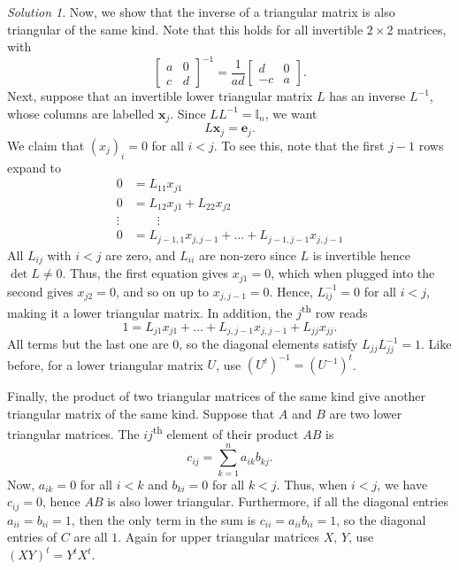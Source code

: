 \documentclass[11pt]{report}
\renewcommand\vec\boldsymbol
\def\vx{\vec{x}}
\def\ve{\vec{e}}
\theoremstyle{remark}
\newtheorem*{solution}{Solution}
\begin{document}
\begin{solution}
        Now, we show that the inverse of a triangular matrix is also triangular of
        the same kind. Note that this holds for all invertible $2\times 2$ matrices,
        with \[
            \begin{bmatrix}
                a & 0 \\ c & d
            \end{bmatrix}^{-1} = \frac{1}{ad}\begin{bmatrix}
                d & 0 \\ -c & a
            \end{bmatrix}.
        \] Next, suppose that an invertible lower triangular matrix $L$ has an
        inverse $L^{-1}$, whose columns are labelled $\vx_j$. Since $L L^{-1} =
        \mathbb{I}_n$, we want \[
            L\vx_j = \ve_{j}.
        \] We claim that $(x_{j})_i = 0$ for all $i < j$. To see this, note that the
        first $j - 1$ rows expand to \begin{align*}
            0 &= L_{11}x_{j1} \\
            0 &= L_{12}x_{j1} + L_{22}x_{j2} \\
            \vdots &\qquad \vdots \\
            0 &= L_{j - 1, 1}x_{j, j - 1} + \dots + L_{j-1, j-1}x_{j, j - 1}
        \end{align*}
        All $L_{ij}$ with $i < j$ are zero, and $L_{ii}$ are non-zero since $L$ is
        invertible hence $\det{L} \neq 0$. Thus, the first equation gives $x_{j1} =
        0$, which when plugged into the second gives $x_{j2} = 0$, and so on up to
        $x_{j, j - 1} = 0$. Hence, $L^{-1}_{ij} = 0$ for all $i < j$, making it a
        lower triangular matrix. In addition, the $j$\textsuperscript{th} row reads
        \[
            1 = L_{j1}x_{j1} + \dots + L_{j,j - 1}x_{j, j - 1} + L_{jj} x_{jj}.
        \] All terms but the last one are $0$, so the diagonal elements satisfy
        $L_{jj}L^{-1}_{jj} = 1$.
        Like before, for a lower triangular matrix $U$, use
        $(U^t)^{-1} = (U^{-1})^t$.

        Finally, the product of two triangular matrices of the same kind give
        another triangular matrix of the same kind. Suppose that $A$ and $B$ are two
        lower triangular matrices. The $ij$\textsuperscript{th} element of their
        product $AB$ is \[
            c_{ij} = \sum_{k = 1}^n a_{ik}b_{kj}.
        \] Now, $a_{ik} = 0$ for all $i < k$ and $b_{ki} = 0$ for all $k < j$. Thus,
        when $i < j$, we have $c_{ij} = 0$, hence $AB$ is also lower triangular.
        Furthermore, if all the diagonal entries $a_{ii} = b_{ii} = 1$, then the
        only term in the sum is $c_{ii} = a_{ii}b_{ii} = 1$, so the diagonal entries
        of $C$ are all $1$.  Again for upper triangular matrices $X$, $Y$, use
        $(XY)^t = Y^tX^t$.


\end{solution}
\end{document}
